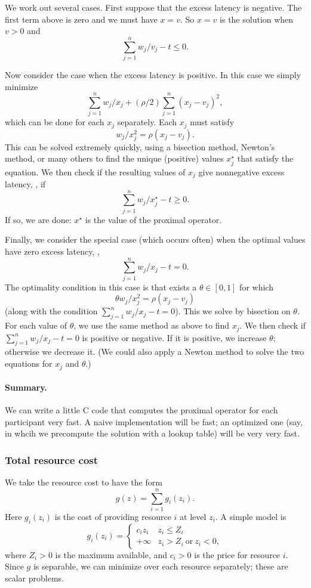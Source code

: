 We work out several cases.  First suppose that the excess latency
is negative.  
The first term above is zero and we must have $x=v$.  So $x=v$ is
the solution when $v>0$ and
\[
\sum_{j=1}^n w_j/v_j - t \leq 0.
\]

Now consider the case when the excess latency is positive.  In this case
we simply minimize
\[
\sum_{j=1}^n w_j/x_j +
(\rho/2)\sum_{j=1}^n (x_j - v_j)^2,
\]
which can be done for each $x_j$ separately.
Each $x_j$ must satisfy
\[
w_j/x_j^2  = \rho(x_j - v_j).
\]
This can be solved extremely quickly, using a bisection method, Newton's
method, or many others to find the unique (positive) 
values $x_j^\star$ that satisfy
the equation.
We then check if the resulting values of $x_j$ give nonnegative
excess latency, \ie, if 
\[
\sum_{j=1}^n w_j/x_j^\star - t  \geq 0.
\]
If so, we are done: $x^\star$ is the value of the proximal operator.

Finally, we consider the special case (which occurs often) when
the optimal values have zero excess latency, \ie,
\[
\sum_{j=1}^n w_j/x_j - t  = 0.
\]
The optimality condition in this case is that exists a $\theta \in [0,1]$
for which
\[
\theta w_j/x_j^2 = \rho(x_j - v_j)
\]
(along with the condition $\sum_{j=1}^n w_j/x_j - t  = 0$).
This we solve by bisection on $\theta$.  For each value of $\theta$,
we use the same method as above to find $x_j$.  We then check if
$\sum_{j=1}^n w_j/x_j - t  = 0$ is positive or negative.
If it is positive, we increase $\theta$; otherwise we decrease it.
(We could also apply a Newton method to solve the two equations for
$x_j$ and $\theta$.)

\paragraph{Summary.} 
We can write a little C code that computes the proximal operator
for each participant very fast.
A naive implementation will be fast; an optimized one (say,
in whcih we precompute the solution with a lookup table) will be very very
fast.

\subsubsection{Total resource cost}

We take the resource cost to have the form
\[
g(z) = \sum_{i=1}^n g_i(z_i).
\]
Here $g_i(z_i)$ is the cost of providing resource $i$ at level $z_i$.
A simple model is 
\[
g_i(z_i) = \left\{ \begin{array}{ll} 
c_i z_i & z_i \leq Z_i\\
+ \infty & z_i > Z_i ~\mbox{or}~z_i<0,
\end{array} \right.
\]
where $Z_i>0$ is the maximum available, and $c_i>0$ is the price for
resource $i$.
Since $g$ is separable, we can minimize over each resource 
separately; these are scalar problems.

